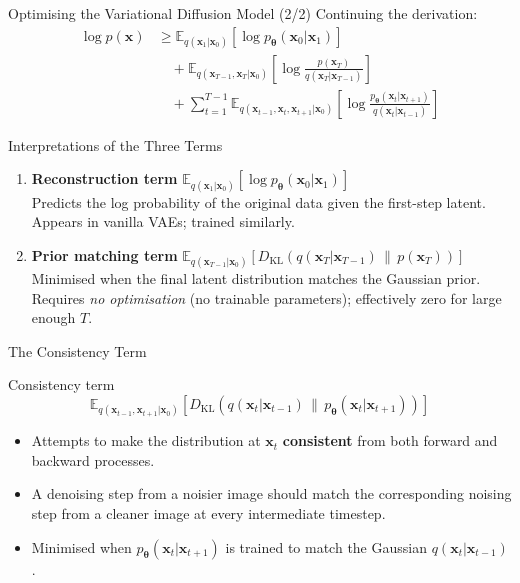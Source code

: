 \documentclass[aspectratio=169,10pt]{beamer}
\newcommand{\bx}{\bm{x}}
\newcommand{\btheta}{\bm{\theta}}
\begin{document}
\begin{frame}{Optimising the Variational Diffusion Model (2/2)}
  Continuing the derivation:
  \begin{align*}
    \log p(\bx)
    &\geq \mathbb{E}_{q(\bx_{1}|\bx_0)}
          \!\left[\log p_{\btheta}(\bx_0|\bx_1)\right] \\
    &\quad + \mathbb{E}_{q(\bx_{T-1},\bx_T|\bx_0)}
          \!\left[\log\frac{p(\bx_T)}{q(\bx_T|\bx_{T-1})}\right] \\
    &\quad + \sum_{t=1}^{T-1}
          \mathbb{E}_{q(\bx_{t-1},\bx_t,\bx_{t+1}|\bx_0)}
          \!\left[\log\frac{p_{\btheta}(\bx_t|\bx_{t+1})}
                           {q(\bx_t|\bx_{t-1})}\right]
  \end{align*}
\end{frame}

\begin{frame}{Interpretations of the Three Terms}
  \begin{enumerate}
    \item \textbf{Reconstruction term}
          $\mathbb{E}_{q(\bx_1|\bx_0)}\!\left[\log p_{\btheta}(\bx_0|\bx_1)\right]$\\
          Predicts the log probability of the original data given the
          first-step latent. Appears in vanilla VAEs; trained similarly.

    \vspace{6pt}
    \item \textbf{Prior matching term}
          $\mathbb{E}_{q(\bx_{T-1}|\bx_0)}\!\left[D_{\mathrm{KL}}(q(\bx_T|\bx_{T-1})
          \,\|\, p(\bx_T))\right]$\\
          Minimised when the final latent distribution matches the Gaussian
          prior. Requires \emph{no optimisation} (no trainable parameters);
          effectively zero for large enough $T$.
  \end{enumerate}
\end{frame}

\begin{frame}{The Consistency Term}
  \begin{block}{Consistency term}
    \[
      \mathbb{E}_{q(\bx_{t-1},\bx_{t+1}|\bx_0)}
      \!\left[D_{\mathrm{KL}}\!\left(q(\bx_t|\bx_{t-1})\,\Big\|\,
      p_{\btheta}(\bx_t|\bx_{t+1})\right)\right]
    \]
  \end{block}
  \begin{itemize}
    \item Attempts to make the distribution at $\bx_t$ \textbf{consistent}
          from both forward and backward processes.
    \item A denoising step from a noisier image should match the
          corresponding noising step from a cleaner image at every
          intermediate timestep.
    \item Minimised when $p_{\btheta}(\bx_t|\bx_{t+1})$ is trained to match
          the Gaussian $q(\bx_t|\bx_{t-1})$.
  \end{itemize}
\end{frame}
\end{document}

